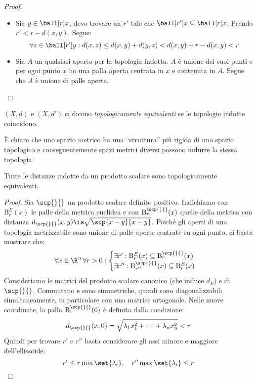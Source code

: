 \begin{proof}~
	\begin{itemize}
		\item
			Sia $y \in \ball[r]x$,
			devo trovare un $r'$ tale che $\ball[r']x \subseteq \ball[r]x$.
			Prendo $r' < r-d(x,y)$.
			Segue:
			\[\forall z \in \ball[r']y: d(x,z) \le d(x,y) + d(y,z) < d(x,y)  + r - d(x,y) < r\]
		\item
			Sia $A$ un qualsiasi aperto per la topologia indotta.
			$A$ è unione dei suoi punti e per ogni punto $x$ ho una palla aperta centrata in $x$ e contenuta in $A$.
			Segue che $A$ è unione di palle aperte.
		\qedhere
	\end{itemize}
\end{proof}

\begin{defn}
	$(X,d)$ e $(X,d')$ si dicono \emph{topologicamente equivalenti} se le topologie indotte coincidono.
\end{defn}

\begin{oss}
	È chiaro che uno spazio metrico ha una ``struttura'' più rigida di uno spazio topologico e conseguentemente spazi metrici diversi possono indurre la stessa topologia.
\end{oss}

\begin{teo}
	Tutte le distanze indotte da un prodotto scalare sono topologicamente equivalenti.
\end{teo}

\begin{proof}
	Sia $\scp{}{}$ un prodotto scalare definito positivo.
	Indichiamo con $\mathrm B^E_r(x)$ le palle della metrica euclidea e con $\mathrm B^{\scp{}{}}_r(x)$ quelle della metrica con distanza $d_{\scp{}{}}(x,y)\is\sqrt{\scp{x-y}{x-y}}$.
	Poiché gli aperti di una topologia metrizzabile sono unione di palle aperte centrate su ogni punto, ci basta mostrare che:
	\[\forall x\in\R^n\,\forall r>0:
	\begin{cases}
		\exists r':\mathrm B^E_{r'}(x)\subseteq\mathrm B^{\scp{}{}}_r(x) \\
		\exists r'':\mathrm B^{\scp{}{}}_{r''}(x)\subseteq\mathrm B^E_r(x)
	\end{cases}
	\]
	Consideriamo le matrici del prodotto scalare canonico (che induce $d_E$) e di $\scp{}{}$.
	Commutano e sono simmetriche, quindi sono diagonalizzabili simultaneamente, in particolare con una matrice ortogonale.
	Nelle nuove coordinate, la palla $\mathrm B^{\scp{}{}}_r(0)$ è definita dalla condizione:
	\[d_{\scp{}{}}(x,0)=\sqrt{\lambda_1x_1^2+\dots+\lambda_nx_n^2}<r\]
	Quindi per trovare $r'$ e $r''$ basta considerare gli assi minore e maggiore dell'ellissoide:
	\[r'\le r\min\set{\lambda_i},\quad r''\max\set{\lambda_i}\le r \qedhere\]
\end{proof}

